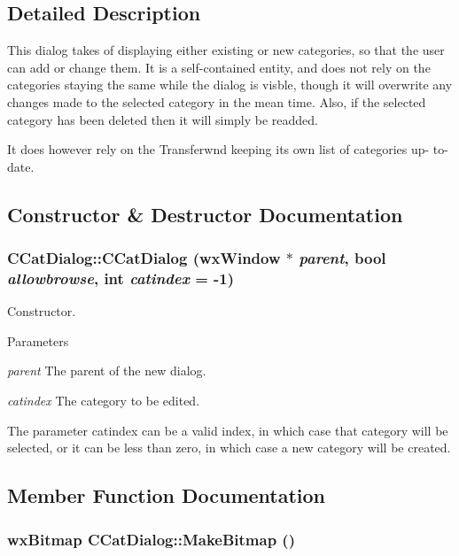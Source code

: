 \subsection{Detailed Description}
This dialog takes of displaying either existing or new categories, so that the user can add or change them. It is a self-\/contained entity, and does not rely on the categories staying the same while the dialog is visble, though it will overwrite any changes made to the selected category in the mean time. Also, if the selected category has been deleted then it will simply be readded.

It does however rely on the Transferwnd keeping its own list of categories up-\/ to-\/date. 

\subsection{Constructor \& Destructor Documentation}
\subsubsection[{CCatDialog}]{\setlength{\rightskip}{0pt plus 5cm}CCatDialog::CCatDialog (wxWindow $\ast$ {\em parent}, \/  bool {\em allowbrowse}, \/  int {\em catindex} = {\ttfamily -\/1})}\label{classCCatDialog_a69796bfc51959c91f67597fbeb3a5cd6}


Constructor. 
\begin{DoxyParams}{Parameters}
\item[{\em parent}]The parent of the new dialog. \item[{\em catindex}]The category to be edited.\end{DoxyParams}
The parameter catindex can be a valid index, in which case that category will be selected, or it can be less than zero, in which case a new category will be created. 

\subsection{Member Function Documentation}
\subsubsection[{MakeBitmap}]{\setlength{\rightskip}{0pt plus 5cm}wxBitmap CCatDialog::MakeBitmap ()\hspace{0.3cm}{\ttfamily  [private]}}\label{classCCatDialog_a1ba08933e939db973a97183afc44ad4f}


